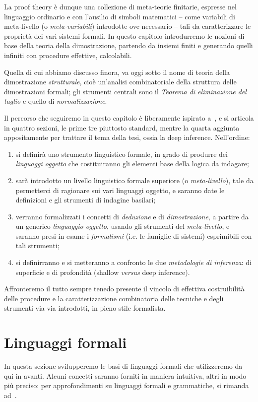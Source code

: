 \documentclass[12pt,a4paper,openright,twoside]{report}
\begin{document}
La proof theory \`e dunque una collezione di meta-teorie finitarie, espresse nel linguaggio ordinario e con l'ausilio di simboli matematici -- come variabili di meta-livello (o \emph{meta-variabili}) introdotte ove necessario -- tali da caratterizzare le propriet\`a dei vari sistemi formali. In questo capitolo introdurremo le nozioni di base della teoria della dimostrazione, partendo da insiemi finiti e generando quelli infiniti con procedure effettive, calcolabili.

Quella di cui abbiamo discusso finora, va oggi sotto il nome di teoria della dimostrazione \emph{strutturale}, cio\`e un'analisi combinatoriale della struttura delle dimostrazioni formali; gli strumenti centrali sono il \emph{Teorema di eliminazione del taglio} e quello di \emph{normalizzazione}.

Il percorso che seguiremo in questo capitolo \`e liberamente ispirato a~\cite{Kle52}, e si articola in quattro sezioni, le prime tre piuttosto standard, mentre la quarta aggiunta appositamente per trattare il tema della tesi, ossia la deep inference. Nell'ordine:

\begin{enumerate}
	\item si definir\`a uno strumento linguistico formale, in grado di produrre dei \emph{linguaggi oggetto} che costituiranno gli elementi base della logica da indagare;
	\item sar\`a introdotto un livello linguistico formale superiore (o \emph{meta-livello}), tale da permetterci di ragionare sui vari linguaggi oggetto, e saranno date le definizioni e gli strumenti di indagine basilari;
	\item verranno formalizzati i concetti di \emph{deduzione} e di \emph{dimostrazione}, a partire da un generico \emph{linguaggio oggetto}, usando gli strumenti del \emph{meta-livello}, e saranno presi in esame i \emph{formalismi} (i.e. le famiglie di sistemi) esprimibili con tali strumenti;
	\item si definirranno e si metteranno a confronto le due \emph{metodologie di inferenza}: di superficie e di profondit\`a (shallow \emph{versus} deep inference).
\end{enumerate}
Affronteremo il tutto sempre tenedo presente il vincolo di effettiva costruibilit\`a delle procedure e la caratterizzazione combinatoria delle tecniche e degli strumenti via via introdotti, in pieno stile formalista.


\section{Linguaggi formali} 
In questa sezione svilupperemo le basi di linguaggi formali che utilizzeremo da qui in avanti. Alcuni concetti saranno forniti in maniera intuitiva, altri in modo pi\`u preciso: per approfondimenti su linguaggi formali e grammatiche, si rimanda ad~\cite{Aho72, Aho06}.
\end{document}
